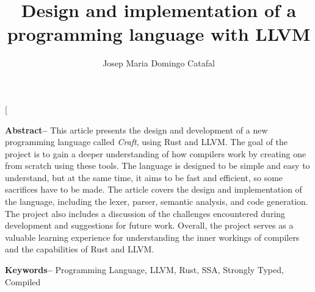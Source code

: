 ﻿\documentclass[10pt,a4paper,twocolumn,twoside]{article}
\author{\LARGE\sffamily Josep Maria Domingo Catafal}
\title{\Huge{\sffamily  Design and implementation of a programming language with LLVM }}
\date{}
\begin{document}
\fancyhead[RO]{\thepage}
\fancyhead[LE]{\thepage}

\fancyfoot[CO,CE]{}

{
   \fancyhf{}
}

\renewcommand{\headrulewidth}{0pt}
\renewcommand{\footrulewidth}{0pt}
\pagestyle{fancy}

\twocolumn[\begin{@twocolumnfalse}

\maketitle

\thispagestyle{primerapagina}

\begin{center}
\parbox{0.915\textwidth}
{\sffamily

    \textbf{Abstract--} This article presents the design and development of a new
    programming language called \textit{Craft}, using Rust and LLVM. The goal of
    the project is to gain a deeper understanding of how compilers work by
    creating one from scratch using these tools. The language is designed to be
    simple and easy to understand, but at the same time, it aims to be fast and
    efficient, so some sacrifices have to be made. The article covers the design
    and implementation of the language, including the lexer, parser, semantic
    analysis, and code generation. The project also includes a discussion of the
    challenges encountered during development and suggestions for future work.
    Overall, the project serves as a valuable learning experience for
    understanding the inner workings of compilers and the capabilities of Rust
    and LLVM.

    \bigskip

    \textbf{Keywords-- } Programming Language, LLVM, Rust, SSA, Strongly Typed, Compiled

    \bigskip

}
\end{center}
\end{@twocolumnfalse}
\end{document}
